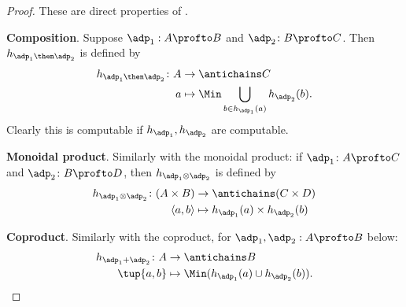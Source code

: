 \begin{proof}
    These are direct properties of \DP.


    \textbf{Composition}. Suppose $\adp_1 : A \profto B$ and $\adp_2 \colon B \profto C$. Then $h_{\adp_1\then \adp_2} $ is defined by
    \begin{equation}
        \begin{aligned}
            h_{\adp_1 \then \adp_2} \colon A &\to \antichains C \\
            a &\mapsto \Min \bigcup_{b \in h_{\adp_1}(a)} h_{\adp_2}(b).
        \end{aligned}
    \end{equation}
    Clearly this is computable if $h_{\adp_1}, h_{\adp_2}$ are computable.


    \textbf{Monoidal product}. Similarly with the monoidal product: if $\adp_1 \colon A \profto C$ and $\adp_2 \colon B \profto D$, then $h_{\adp_1 \otimes \adp_2}$ is defined by
    \begin{equation}
        \begin{aligned}
            h_{\adp_1 \otimes \adp_2} \colon (A \times B) &\to \antichains (C \times D) \\
            \langle a, b \rangle &\mapsto h_{\adp_1}(a) \times h_{\adp_2}(b)
        \end{aligned}
    \end{equation}

    \textbf{Coproduct}. Similarly with the coproduct, for $\adp_1, \adp_2 : A \profto B$ below:
    \begin{equation}
        \begin{aligned}
            h_{\adp_1 + \adp_2} \colon  A &\to \antichains B \\
            \tup{a,b} &\mapsto \Min (h_{\adp_1}(a) \cup h_{\adp_2}(b)).
        \end{aligned}
    \end{equation}

\end{proof}

